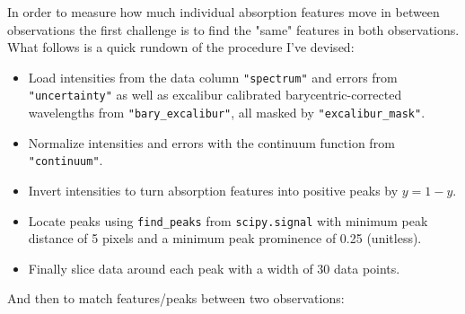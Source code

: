     In order to measure how much individual absorption features move in between observations the first challenge is to find the "same" features in both observations. What follows is a quick rundown of the procedure I've devised:
    
    \begin{itemize}
        \item Load intensities from the data column \verb|"spectrum"| and errors from \verb|"uncertainty"| as well as excalibur calibrated barycentric-corrected wavelengths from \verb|"bary_excalibur"|, all masked by \verb|"excalibur_mask"|.
        \item Normalize intensities and errors with the continuum function from \verb|"continuum"|.
        \item Invert intensities to turn absorption features into positive peaks by $y = 1 - y$.
        \item Locate peaks using \verb|find_peaks| from \verb|scipy.signal| with minimum peak distance of 5 pixels and a minimum peak prominence of 0.25 (unitless).
        \item Finally slice data around each peak with a width of 30 data points. 
    \end{itemize}

    And then to match features/peaks between two observations:

